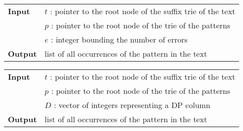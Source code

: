 \begin{figure*}[b]
\begin{center}
\begin{minipage}[t]{.8\textwidth}
\begin{algorithm}[H]
\begin{tabular}{ll}
\textbf{Input}  & $t$ : pointer to the root node of the suffix trie of the text\\
 			    & $p$ : pointer to the root node of the trie of the patterns\\
 			    & $e$ : integer bounding the number of errors\\
\textbf{Output} & list of all occurrences of the pattern in the text\\
\end{tabular}
\begin{algorithmic}[1]
	\State {}
\Else
	\State {}
	\State {}
	\State {}
		\Repeat
			\State {}
			\State {}
			\State {}
			\State {}
	\EndIf
\EndIf
\end{algorithmic}
\label{alg:st-edit-explicit}
\end{algorithm}
\end{minipage}
\end{center}
\end{figure*}

\begin{figure*}[b]
\begin{center}
\begin{minipage}[t]{.8\textwidth}
\begin{algorithm}[H]
\begin{tabular}{ll}
\textbf{Input}  & $t$ : pointer to the root node of the suffix trie of the text\\
 			    & $p$ : pointer to the root node of the trie of the patterns\\
 			    & $D$ : vector of integers representing a DP column\\
\textbf{Output} & list of all occurrences of the pattern in the text\\
\end{tabular}
\begin{algorithmic}[1]
	\State \Report {}
		\Repeat
			\State {}
			\State {}
			\State {}
	\EndIf
\EndIf
\end{algorithmic}
\label{alg:st-edit}
\end{algorithm}
\end{minipage}
\end{center}
\end{figure*}

